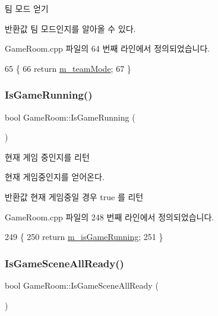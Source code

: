 팀 모드 얻기 

\begin{DoxyReturn}{반환값}
팀 모드인지를 알아올 수 있다. 
\end{DoxyReturn}


Game\+Room.\+cpp 파일의 64 번째 라인에서 정의되었습니다.


\begin{DoxyCode}
65 \{ 
66     \textcolor{keywordflow}{return} \hyperlink{class_game_room_aef7875998ee1bf83eb23e249b5659bc7}{m\_teamMode}; 
67 \}
\end{DoxyCode}
\mbox{\label{class_game_room_adf07d76d35c157f22d677f1570d957dc}} 
\subsubsection{\texorpdfstring{Is\+Game\+Running()}{IsGameRunning()}}
{\footnotesize\ttfamily bool Game\+Room\+::\+Is\+Game\+Running (\begin{DoxyParamCaption}{ }\end{DoxyParamCaption})}



현재 게임 중인지를 리턴 

현재 게임중인지를 얻어온다.

\begin{DoxyReturn}{반환값}
현재 게임중일 경우 true 를 리턴 
\end{DoxyReturn}


Game\+Room.\+cpp 파일의 248 번째 라인에서 정의되었습니다.


\begin{DoxyCode}
249 \{
250     \textcolor{keywordflow}{return} \hyperlink{class_game_room_afd3dbeca203aed6a441449ce8a640d15}{m\_isGameRunning};
251 \}
\end{DoxyCode}
\mbox{\label{class_game_room_a9ddf75762a180d08b98955405d94a3bb}} 
\subsubsection{\texorpdfstring{Is\+Game\+Scene\+All\+Ready()}{IsGameSceneAllReady()}}
{\footnotesize\ttfamily bool Game\+Room\+::\+Is\+Game\+Scene\+All\+Ready (\begin{DoxyParamCaption}{ }\end{DoxyParamCaption})}



